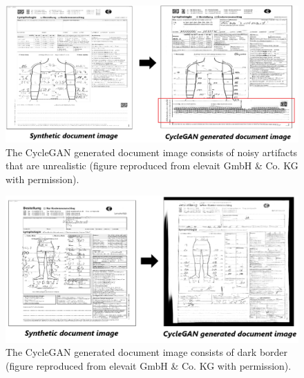 \begin{figure}[H]
        \begin{center}
	    \includegraphics[scale=0.50]{images/Evaluation/failure2.png}
	    \caption[The \ac{CycleGAN} generated document image consists of noisy artifacts that are unrealistic.]{The \ac{CycleGAN} generated document image consists of noisy artifacts that are unrealistic (figure reproduced from elevait GmbH \& Co. KG with permission).}
	    \label{fig:failure2}
	    \end{center}
\end{figure}

\begin{figure}[H]
        \begin{center}
	    \includegraphics[scale=0.53]{images/Evaluation/failure3.png}
	    \caption[The \ac{CycleGAN} generated document image consists of dark border.]{The \ac{CycleGAN} generated document image consists of dark border (figure reproduced from elevait GmbH \& Co. KG with permission).}
	    \label{fig:failure3}
	    \end{center}
\end{figure}


